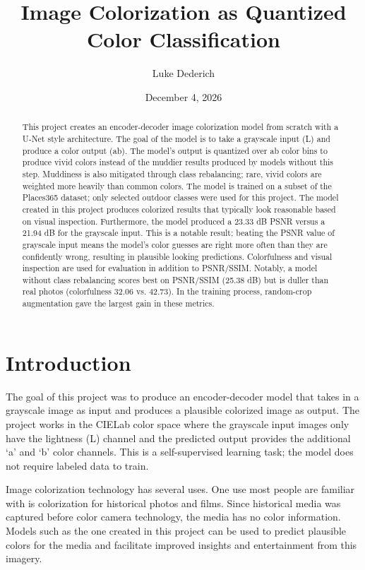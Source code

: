 \documentclass{article}
\title{Image Colorization as Quantized Color Classification}
\author{Luke Dederich}
\date{December 4, 2026}
\begin{document}
\maketitle

\begin{abstract}
\noindent This project creates an encoder-decoder image colorization model from scratch with a U-Net style architecture. The goal of the model is to take a grayscale input (L) and produce a color output (ab). The model's output is quantized over ab color bins to produce vivid colors instead of the muddier results produced by models without this step. Muddiness is also mitigated through class rebalancing; rare, vivid colors are weighted more heavily than common colors. The model is trained on a subset of the Places365 dataset; only selected outdoor classes were used for this project. The model created in this project produces colorized results that typically look reasonable based on visual inspection. Furthermore, the model produced a 23.33 dB PSNR versus a 21.94 dB for the grayscale input. This is a notable result; beating the PSNR value of grayscale input means the model's color guesses are right more often than they are confidently wrong, resulting in plausible looking predictions. Colorfulness and visual inspection are used for evaluation in addition to PSNR/SSIM. Notably, a model without class rebalancing scores best on PSNR/SSIM (25.38 dB) but is duller than real photos (colorfulness 32.06 vs. 42.73). In the training process, random-crop augmentation gave the largest gain in these metrics.
\end{abstract}

\section{Introduction}

The goal of this project was to produce an encoder-decoder model that takes in a grayscale image as input and produces a plausible colorized image as output. The project works in the CIELab color space where the grayscale input images only have the lightness (L) channel and the predicted output provides the additional ‘a’ and ‘b’ color channels. This is a self-supervised learning task; the model does not require labeled data to train.

Image colorization technology has several uses. One use most people are familiar with is colorization for historical photos and films. Since historical media was captured before color camera technology, the media has no color information. Models such as the one created in this project can be used to predict plausible colors for the media and facilitate improved insights and entertainment from this imagery.
\end{document}
